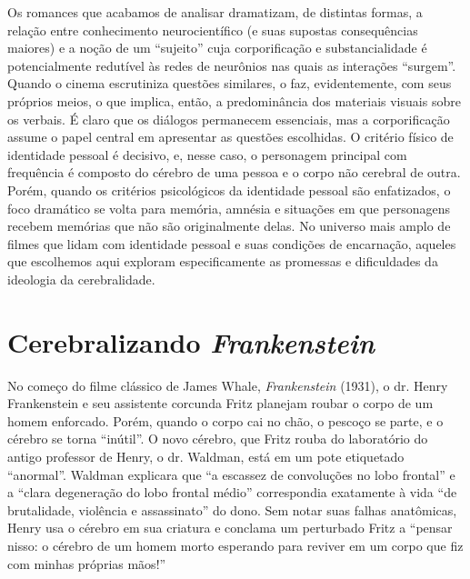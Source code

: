 Os romances que acabamos de analisar dramatizam, de distintas formas, a
relação entre conhecimento neurocientífico (e suas supostas
consequências maiores) e a noção de um ``sujeito'' cuja corporificação e
substancialidade é potencialmente redutível às redes de neurônios nas
quais as interações ``surgem''. Quando o cinema escrutiniza questões
similares, o faz, evidentemente, com seus próprios meios, o que implica,
então, a predominância dos materiais visuais sobre os verbais. É claro
que os diálogos permanecem essenciais, mas a corporificação assume o
papel central em apresentar as questões escolhidas. O critério físico de
identidade pessoal é decisivo, e, nesse caso, o personagem principal com
frequência é composto do cérebro de uma pessoa e o corpo não cerebral de
outra. Porém, quando os critérios psicológicos da identidade pessoal são
enfatizados, o foco dramático se volta para memória, amnésia e situações
em que personagens recebem memórias que não são originalmente delas. No
universo mais amplo de filmes que lidam com identidade pessoal e suas
condições de encarnação, aqueles que escolhemos aqui exploram
especificamente as promessas e dificuldades da ideologia da
cerebralidade.

\section{Cerebralizando \emph{Frankenstein}}

No começo do filme clássico de James Whale, \emph{Frankenstein} (1931),
o dr. Henry Frankenstein e seu assistente corcunda Fritz planejam roubar
o corpo de um homem enforcado. Porém, quando o corpo cai no chão, o
pescoço se parte, e o cérebro se torna ``inútil''. O novo cérebro, que
Fritz rouba do laboratório do antigo professor de Henry, o dr. Waldman,
está em um pote etiquetado ``anormal''. Waldman explicara que ``a
escassez de convoluções no lobo frontal'' e a ``clara degeneração do
lobo frontal médio'' correspondia exatamente à vida ``de brutalidade,
violência e assassinato'' do dono. Sem notar suas falhas anatômicas,
Henry usa o cérebro em sua criatura e conclama um perturbado Fritz a
``pensar nisso: o cérebro de um homem morto esperando para reviver em um
corpo que fiz com minhas próprias mãos!''

